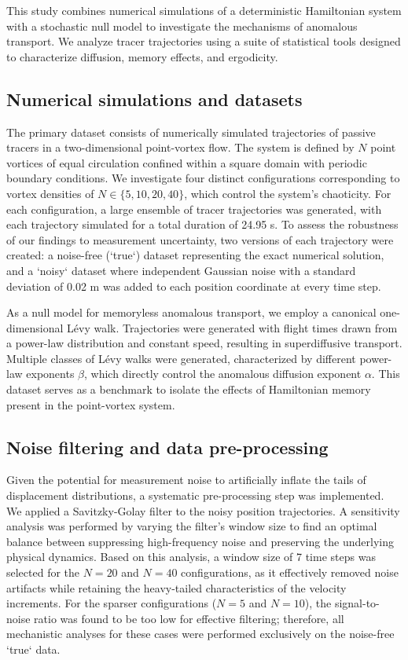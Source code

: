 \documentclass[]{article}
\begin{document}
This study combines numerical simulations of a deterministic Hamiltonian system with a stochastic null model to investigate the mechanisms of anomalous transport. We analyze tracer trajectories using a suite of statistical tools designed to characterize diffusion, memory effects, and ergodicity.

\subsection{Numerical simulations and datasets}

The primary dataset consists of numerically simulated trajectories of passive tracers in a two-dimensional point-vortex flow. The system is defined by $N$ point vortices of equal circulation confined within a square domain with periodic boundary conditions. We investigate four distinct configurations corresponding to vortex densities of $N \in \{5, 10, 20, 40\}$, which control the system's chaoticity. For each configuration, a large ensemble of tracer trajectories was generated, with each trajectory simulated for a total duration of 24.95 s. To assess the robustness of our findings to measurement uncertainty, two versions of each trajectory were created: a noise-free (`true`) dataset representing the exact numerical solution, and a `noisy` dataset where independent Gaussian noise with a standard deviation of 0.02 m was added to each position coordinate at every time step.

As a null model for memoryless anomalous transport, we employ a canonical one-dimensional L\'evy walk. Trajectories were generated with flight times drawn from a power-law distribution and constant speed, resulting in superdiffusive transport. Multiple classes of L\'evy walks were generated, characterized by different power-law exponents $\beta$, which directly control the anomalous diffusion exponent $\alpha$. This dataset serves as a benchmark to isolate the effects of Hamiltonian memory present in the point-vortex system.

\subsection{Noise filtering and data pre-processing}

Given the potential for measurement noise to artificially inflate the tails of displacement distributions, a systematic pre-processing step was implemented. We applied a Savitzky-Golay filter to the noisy position trajectories. A sensitivity analysis was performed by varying the filter's window size to find an optimal balance between suppressing high-frequency noise and preserving the underlying physical dynamics. Based on this analysis, a window size of 7 time steps was selected for the $N=20$ and $N=40$ configurations, as it effectively removed noise artifacts while retaining the heavy-tailed characteristics of the velocity increments. For the sparser configurations ($N=5$ and $N=10$), the signal-to-noise ratio was found to be too low for effective filtering; therefore, all mechanistic analyses for these cases were performed exclusively on the noise-free `true` data.
\end{document}

